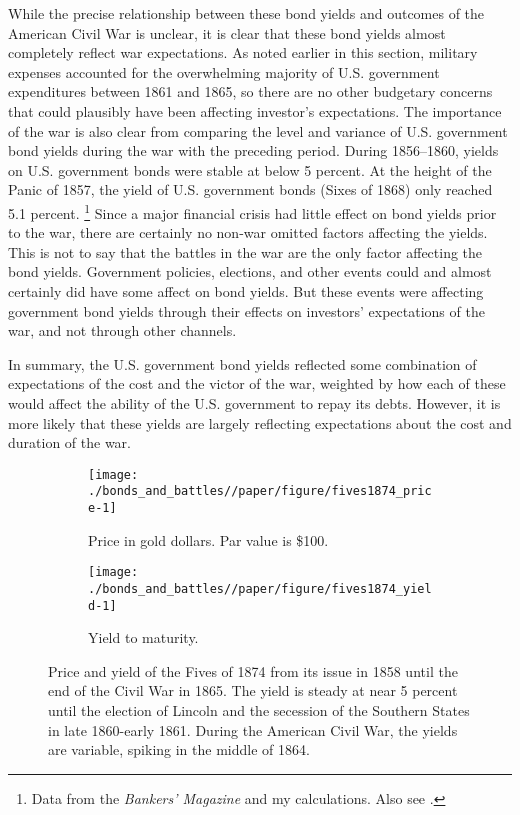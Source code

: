
While the precise relationship between these bond yields and outcomes of the American Civil War is unclear, it is clear that these bond yields almost completely reflect war expectations.
As noted earlier in this section, military expenses accounted for the overwhelming majority of U.S. government expenditures between 1861 and 1865, so there are no other budgetary concerns that could plausibly have been affecting investor's expectations.
The importance of the war is also clear from comparing the level and variance of U.S. government bond yields during the war with the preceding period.
During 1856--1860, yields on U.S. government bonds were stable at below 5 percent.
At the height of the Panic of 1857, the yield of U.S. government bonds (Sixes of 1868) only reached 5.1 percent.%
\footnote{Data from the \textit{Bankers' Magazine} and my calculations. Also see \textcite{HomerSylla2005}.}
Since a major financial crisis had little effect on bond yields prior to the war, there are certainly no non-war omitted factors affecting the yields.
This is not to say that the battles in the war are the only factor affecting the bond yields.
Government policies, elections, and other events could and almost certainly did have some affect on bond yields.
But these events were affecting government bond yields through their effects on investors' expectations of the war, and not through other channels.

In summary, the U.S. government bond yields reflected some combination of expectations of the cost and the victor of the war, weighted by how each of these would affect the ability of the U.S. government to repay its debts.
However, it is more likely that these yields are largely reflecting expectations about the cost and duration of the war.

\begin{figure}[!htpb]
  \centering
  \begin{subfigure}[t]{\linewidth}
   \texttt{[image: ./bonds\_and\_battles//paper/figure/fives1874\_price-1]}
  \caption{Price in gold dollars. Par value is \$100.}
  \label{bonds:fig:fives1874_price}
\end{subfigure}
\begin{subfigure}[t]{\linewidth}
   \texttt{[image: ./bonds\_and\_battles//paper/figure/fives1874\_yield-1]}
  \caption{Yield to maturity.}
  \label{bonds:fig:fives1874_yield}
\end{subfigure}
\caption[Price and yield of the Fives of 1874 from its issue in 1858 until the end of the Civil War in 1865]{Price and yield of the Fives of 1874 from its issue in 1858 until the end of the Civil War in 1865.
The yield is steady at near 5 percent until the election of Lincoln and the secession of the Southern States in late 1860-early 1861.
During the American Civil War, the yields are variable, spiking in the middle of 1864.
 }
\label{bonds:fig:fives1874_yield_price}
\end{figure}

